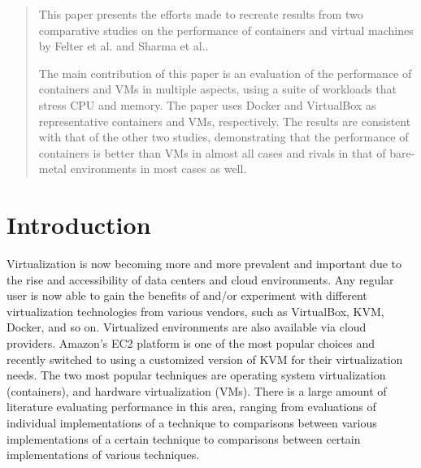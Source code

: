\documentclass{sig-alternate-10pt}
\begin{document}
\maketitle
\begin{abstract}
This paper presents the efforts made to recreate results from two comparative studies on the performance of containers and virtual machines by Felter et al.\cite{felter:2014} and Sharma et al.\cite{sharma:2016}.

The main contribution of this paper is an evaluation of the performance of containers and VMs in multiple aspects, using a suite of workloads that stress CPU and memory. The paper uses Docker\cite{docker} and VirtualBox\cite{virtualbox} as representative containers and VMs, respectively. The results are consistent with that of the other two studies, demonstrating that the performance of containers is better than VMs in almost all cases and rivals in that of bare-metal environments in most cases as well.
\end{abstract}




\section{Introduction}
Virtualization is now becoming more and more prevalent and important due to the rise and accessibility of data centers and cloud environments. Any regular user is now able to gain the benefits of and/or experiment with different virtualization technologies from various vendors, such as VirtualBox, KVM, Docker, and so on. Virtualized environments are also available via cloud providers. Amazon's EC2 platform is one of the most popular choices and recently switched to using a customized version of KVM for their virtualization needs. The two most popular techniques are operating system virtualization (containers), and hardware virtualization (VMs). There is a large amount of literature evaluating performance in this area, ranging from evaluations of individual implementations of a technique to comparisons between various implementations of a certain technique to comparisons between certain implementations of various techniques. 
\end{document}
